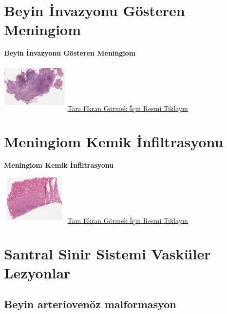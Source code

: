 \documentclass[
  letterpaper,
  DIV=11,
  numbers=noendperiod]{scrreprt}
\begin{document}
\hypertarget{sec-beyin-invazyonu-gosteren-meningiom}{%
\chapter{Beyin İnvazyonu Gösteren
Meningiom}\label{sec-beyin-invazyonu-gosteren-meningiom}}

\textbf{Beyin İnvazyonu Gösteren Meningiom}

\href{https://images.patolojiatlasi.com/brain-invasive-meningioma/HE.html}{\includegraphics[width=0.25\textwidth,height=\textheight]{./screenshots/brain-invasive-meningioma_screenshot.png}}
\href{https://images.patolojiatlasi.com/brain-invasive-meningioma/HE.html}{Tam
Ekran Görmek İçin Resmi Tıklayın}

\hypertarget{sec-kemik-infiltrasyonu-gosteren-meningiom}{%
\chapter{Meningiom Kemik
İnfiltrasyonu}\label{sec-kemik-infiltrasyonu-gosteren-meningiom}}

\textbf{Meningiom Kemik İnfiltrasyonu}

\href{https://images.patolojiatlasi.com/meningioma-bone-infiltration/HE.html}{\includegraphics[width=0.25\textwidth,height=\textheight]{./screenshots/meningioma-bone-infiltration_screenshot.png}}
\href{https://images.patolojiatlasi.com/meningioma-bone-infiltration/HE.html}{Tam
Ekran Görmek İçin Resmi Tıklayın}

\hypertarget{sec-santral-sinir-sistemi-vaskuler}{%
\chapter{Santral Sinir Sistemi Vasküler
Lezyonlar}\label{sec-santral-sinir-sistemi-vaskuler}}

\hypertarget{sec-beyin-arteriovenoz-malformasyon}{%
\section{Beyin arteriovenöz
malformasyon}\label{sec-beyin-arteriovenoz-malformasyon}}
\end{document}
